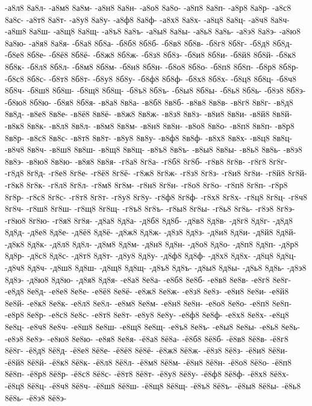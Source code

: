{-а8л8
8а8л-
-а8м8
8а8м-
-а8н8
8а8н-
-а8о8
8а8о-
-а8п8
8а8п-
-а8р8
8а8р-
-а8с8
8а8с-
-а8т8
8а8т-
-а8у8
8а8у-
-а8ф8
8а8ф-
-а8х8
8а8х-
-а8ц8
8а8ц-
-а8ч8
8а8ч-
-а8ш8
8а8ш-
-а8щ8
8а8щ-
-а8ъ8
8а8ъ-
-а8ы8
8а8ы-
-а8ь8
8а8ь-
-а8э8
8а8э-
-а8ю8
8а8ю-
-а8я8
8а8я-
-б8а8
8б8а-
-б8б8
8б8б-
-б8в8
8б8в-
-б8г8
8б8г-
-б8д8
8б8д-
-б8е8
8б8е-
-б8ё8
8б8ё-
-б8ж8
8б8ж-
-б8з8
8б8з-
-б8и8
8б8и-
-б8й8
8б8й-
-б8к8
8б8к-
-б8л8
8б8л-
-б8м8
8б8м-
-б8н8
8б8н-
-б8о8
8б8о-
-б8п8
8б8п-
-б8р8
8б8р-
-б8с8
8б8с-
-б8т8
8б8т-
-б8у8
8б8у-
-б8ф8
8б8ф-
-б8х8
8б8х-
-б8ц8
8б8ц-
-б8ч8
8б8ч-
-б8ш8
8б8ш-
-б8щ8
8б8щ-
-б8ъ8
8б8ъ-
-б8ы8
8б8ы-
-б8ь8
8б8ь-
-б8э8
8б8э-
-б8ю8
8б8ю-
-б8я8
8б8я-
-в8а8
8в8а-
-в8б8
8в8б-
-в8в8
8в8в-
-в8г8
8в8г-
-в8д8
8в8д-
-в8е8
8в8е-
-в8ё8
8в8ё-
-в8ж8
8в8ж-
-в8з8
8в8з-
-в8и8
8в8и-
-в8й8
8в8й-
-в8к8
8в8к-
-в8л8
8в8л-
-в8м8
8в8м-
-в8н8
8в8н-
-в8о8
8в8о-
-в8п8
8в8п-
-в8р8
8в8р-
-в8с8
8в8с-
-в8т8
8в8т-
-в8у8
8в8у-
-в8ф8
8в8ф-
-в8х8
8в8х-
-в8ц8
8в8ц-
-в8ч8
8в8ч-
-в8ш8
8в8ш-
-в8щ8
8в8щ-
-в8ъ8
8в8ъ-
-в8ы8
8в8ы-
-в8ь8
8в8ь-
-в8э8
8в8э-
-в8ю8
8в8ю-
-в8я8
8в8я-
-г8а8
8г8а-
-г8б8
8г8б-
-г8в8
8г8в-
-г8г8
8г8г-
-г8д8
8г8д-
-г8е8
8г8е-
-г8ё8
8г8ё-
-г8ж8
8г8ж-
-г8з8
8г8з-
-г8и8
8г8и-
-г8й8
8г8й-
-г8к8
8г8к-
-г8л8
8г8л-
-г8м8
8г8м-
-г8н8
8г8н-
-г8о8
8г8о-
-г8п8
8г8п-
-г8р8
8г8р-
-г8с8
8г8с-
-г8т8
8г8т-
-г8у8
8г8у-
-г8ф8
8г8ф-
-г8х8
8г8х-
-г8ц8
8г8ц-
-г8ч8
8г8ч-
-г8ш8
8г8ш-
-г8щ8
8г8щ-
-г8ъ8
8г8ъ-
-г8ы8
8г8ы-
-г8ь8
8г8ь-
-г8э8
8г8э-
-г8ю8
8г8ю-
-г8я8
8г8я-
-д8а8
8д8а-
-д8б8
8д8б-
-д8в8
8д8в-
-д8г8
8д8г-
-д8д8
8д8д-
-д8е8
8д8е-
-д8ё8
8д8ё-
-д8ж8
8д8ж-
-д8з8
8д8з-
-д8и8
8д8и-
-д8й8
8д8й-
-д8к8
8д8к-
-д8л8
8д8л-
-д8м8
8д8м-
-д8н8
8д8н-
-д8о8
8д8о-
-д8п8
8д8п-
-д8р8
8д8р-
-д8с8
8д8с-
-д8т8
8д8т-
-д8у8
8д8у-
-д8ф8
8д8ф-
-д8х8
8д8х-
-д8ц8
8д8ц-
-д8ч8
8д8ч-
-д8ш8
8д8ш-
-д8щ8
8д8щ-
-д8ъ8
8д8ъ-
-д8ы8
8д8ы-
-д8ь8
8д8ь-
-д8э8
8д8э-
-д8ю8
8д8ю-
-д8я8
8д8я-
-е8а8
8е8а-
-е8б8
8е8б-
-е8в8
8е8в-
-е8г8
8е8г-
-е8д8
8е8д-
-е8е8
8е8е-
-е8ё8
8е8ё-
-е8ж8
8е8ж-
-е8з8
8е8з-
-е8и8
8е8и-
-е8й8
8е8й-
-е8к8
8е8к-
-е8л8
8е8л-
-е8м8
8е8м-
-е8н8
8е8н-
-е8о8
8е8о-
-е8п8
8е8п-
-е8р8
8е8р-
-е8с8
8е8с-
-е8т8
8е8т-
-е8у8
8е8у-
-е8ф8
8е8ф-
-е8х8
8е8х-
-е8ц8
8е8ц-
-е8ч8
8е8ч-
-е8ш8
8е8ш-
-е8щ8
8е8щ-
-е8ъ8
8е8ъ-
-е8ы8
8е8ы-
-е8ь8
8е8ь-
-е8э8
8е8э-
-е8ю8
8е8ю-
-е8я8
8е8я-
-ё8а8
8ё8а-
-ё8б8
8ё8б-
-ё8в8
8ё8в-
-ё8г8
8ё8г-
-ё8д8
8ё8д-
-ё8е8
8ё8е-
-ё8ё8
8ё8ё-
-ё8ж8
8ё8ж-
-ё8з8
8ё8з-
-ё8и8
8ё8и-
-ё8й8
8ё8й-
-ё8к8
8ё8к-
-ё8л8
8ё8л-
-ё8м8
8ё8м-
-ё8н8
8ё8н-
-ё8о8
8ё8о-
-ё8п8
8ё8п-
-ё8р8
8ё8р-
-ё8с8
8ё8с-
-ё8т8
8ё8т-
-ё8у8
8ё8у-
-ё8ф8
8ё8ф-
-ё8х8
8ё8х-
-ё8ц8
8ё8ц-
-ё8ч8
8ё8ч-
-ё8ш8
8ё8ш-
-ё8щ8
8ё8щ-
-ё8ъ8
8ё8ъ-
-ё8ы8
8ё8ы-
-ё8ь8
8ё8ь-
-ё8э8
8ё8э-
}
